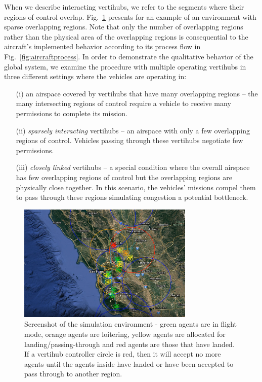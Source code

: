 \label{ssec:SimSet}
When we describe interacting vertihubs, we refer to the segments where their regions of control overlap. Fig.~\ref{fig:sim} presents for an example of an environment with sparse overlapping regions. Note that only the number of overlapping regions rather than the physical area of the overlapping regions is consequential to the aircraft's implemented behavior according to its process flow in Fig.~\ref{fig:aircraftprocess}.
In order to demonstrate the qualitative behavior of the global system, we examine the procedure with multiple operating vertihubs in three different settings where the vehicles are operating in: 
\begin{itemize}
\item[(i)] an airspace covered by vertihubs that have many overlapping regions -- the many intersecting regions of control require a vehicle to receive many permissions to complete its mission.
\item[(ii)] \emph{sparsely interacting} vertihubs -- an airspace with only a few overlapping regions of control. Vehicles passing through these vertihubs negotiate few permissions.
\item[(iii)] \emph{closely linked} vertihubs -- a special condition where the overall airspace has few overlapping regions of control but the overlapping regions are physically close together. In this scenario, the vehicles' missions compel them to pass through these regions simulating congestion a potential bottleneck. 

\end{itemize}

\begin{figure}
	\centering
	\includegraphics[width=0.75\textwidth]{UAM-TCNS/Towers.PNG}
	\caption[Screenshot of the UAM operations simulation environment ]{Screenshot of the simulation environment - green agents are in flight mode, orange agents are loitering, yellow agents are allocated for landing/passing-through and red agents are those that have landed. If a vertihub controller circle is red, then it will accept no more agents until the agents inside have landed or have been accepted to pass through to another region.
	}
	\label{fig:sim}
\end{figure}


